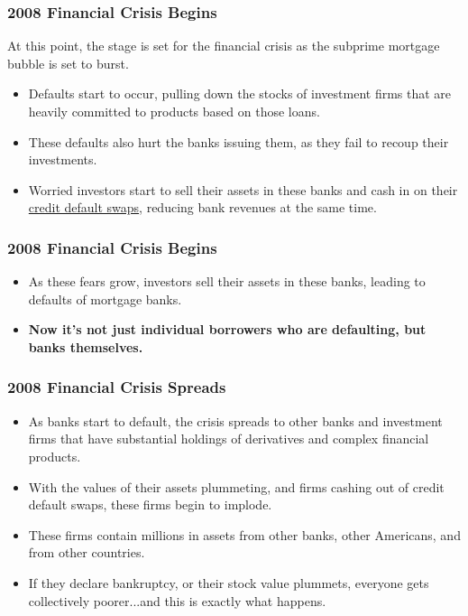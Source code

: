 \documentclass[handout]{beamer}
\begin{document}
\begin{frame} 
	\frametitle{\LARGE{2008 Financial Crisis Begins}}
	At this point, the stage is set for the financial crisis as the subprime mortgage bubble is set to burst.
	\begin{itemize}
		\item Defaults start to occur, pulling down the stocks of investment firms that are heavily committed to products based on those loans.
		\item These defaults also hurt the banks issuing them, as they fail to recoup their investments. \pause
		\item Worried investors start to sell their assets in these banks and cash in on their \href{https://www.investopedia.com/terms/c/creditdefaultswap.asp}{credit default swaps}, reducing bank revenues at the same time.  	
	\end{itemize}
\end{frame}

\begin{frame} 
	\frametitle{\LARGE{2008 Financial Crisis Begins}}
	\begin{itemize}
		\item As these fears grow, investors sell their assets in these banks, leading to defaults of mortgage banks. \pause
		\item \textbf{Now it's not just individual borrowers who are defaulting, but banks themselves.}		
	\end{itemize}
\end{frame}

\begin{frame} 
	\frametitle{\LARGE{2008 Financial Crisis Spreads}}
	\begin{itemize}
		\item As banks start to default, the crisis spreads to other banks and investment firms that have substantial holdings of derivatives and complex financial products. \pause
		\item With the values of their assets plummeting, and firms cashing out of credit default swaps, these firms begin to implode.		
		\item These firms contain millions in assets from other banks, other Americans, and from other countries. 
		\item If they declare bankruptcy, or their stock value plummets, everyone gets collectively poorer...and this is exactly what happens.		
	\end{itemize}
\end{frame}
\end{document}
